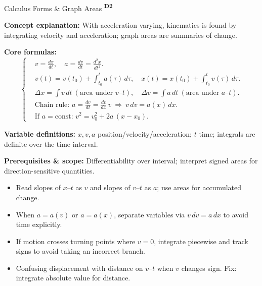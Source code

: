﻿\documentclass[12pt,a4paper]{article}
\providecommand{\KPFormulas}{}
\providecommand{\KPHeuristics}{}
\newcommand{\DTwo}{\texorpdfstring{\textsuperscript{\textbf{D2}}}{ D2}}
\begin{document}
\begin{KnowledgePoint}{Calculus Forms \& Graph Areas \DTwo}
  \KPFormulas
  \begin{formulabox}
  \textbf{Concept explanation:} With acceleration varying, kinematics is found by integrating velocity and acceleration; graph areas are summaries of change.

  \textbf{Core formulas:}
  \[
  \left\{\begin{aligned}
    &v=\frac{dx}{dt},\quad a=\frac{dv}{dt}=\frac{d^2x}{dt^2}.\\
    &v(t)=v(t_0)+\int_{t_0}^t a(\tau)\,d\tau,\quad x(t)=x(t_0)+\int_{t_0}^t v(\tau)\,d\tau.\\
    &\Delta x=\int v\,dt\ (\text{area under }v\text{--}t),\quad \Delta v=\int a\,dt\ (\text{area under }a\text{--}t).\\
    &\text{Chain rule: } a=\frac{dv}{dt}=\frac{dv}{dx}\,v\ \Rightarrow\ v\,dv=a(x)\,dx.\\
    &\text{If }a=\text{const: } v^2=v_0^2+2a\,(x-x_0).
  \end{aligned}\right.
  \]

  \textbf{Variable definitions:} $x,v,a$ position/velocity/acceleration; $t$ time; integrals are definite over the time interval.

  \textbf{Prerequisites \& scope:} Differentiability over interval; interpret signed areas for direction-sensitive quantities.
  \end{formulabox}

  \KPHeuristics
  \begin{heuristicsbox}
  \begin{itemize}[leftmargin=*]
    \item Read slopes of $x$--$t$ as $v$ and slopes of $v$--$t$ as $a$; use areas for accumulated change.
    \item When $a=a(v)$ or $a=a(x)$, separate variables via $v\,dv=a\,dx$ to avoid time explicitly.
    \item If motion crosses turning points where $v=0$, integrate piecewise and track signs to avoid taking an incorrect branch.
  \end{itemize}
  \vspace{0.4em}
  \begin{itemize}[leftmargin=*]
    \item Confusing displacement with distance on $v$--$t$ when $v$ changes sign. Fix: integrate absolute value for distance.
  \end{itemize}
  \end{heuristicsbox}


\end{KnowledgePoint}
\end{document}
